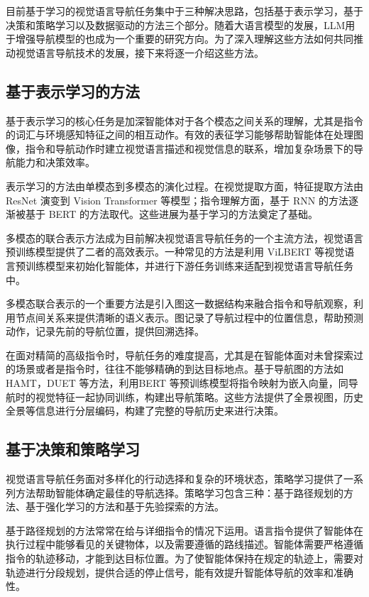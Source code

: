 \documentclass[bachelor]{thesis-uestc}
\begin{document}
目前基于学习的视觉语言导航任务集中于三种解决思路，包括基于表示学习，基于决策和策略学习以及数据驱动的方法三个部分。随着大语言模型的发展，LLM用于增强导航模型的也成为一个重要的研究方向。为了深入理解这些方法如何共同推动视觉语言导航技术的发展，接下来将逐一介绍这些方法。

\subsection{基于表示学习的方法}
   基于表示学习的核心任务是加深智能体对于各个模态之间关系的理解，尤其是指令的词汇与环境感知特征之间的相互动作。有效的表征学习能够帮助智能体在处理图像，指令和导航动作时建立视觉语言描述和视觉信息的联系，增加复杂场景下的导航能力和决策效率。

   表示学习的方法由单模态到多模态的演化过程。在视觉提取方面，特征提取方法由 ResNet\cite{he2015deep} 演变到 Vision Transformer\cite{dosovitskiyImageWorth16x162021} 等模型；指令理解方面，基于 RNN\cite{Sherstinsky_2020} 的方法逐渐被基于 BERT\cite{devlinBERTPretrainingDeep2019} 的方法取代。这些进展为基于学习的方法奠定了基础。

   多模态的联合表示方法成为目前解决视觉语言导航任务的一个主流方法，视觉语言预训练模型提供了二者的高效表示。一种常见的方法是利用 ViLBERT 等视觉语言预训练模型来初始化智能体，并进行下游任务训练来适配到视觉语言导航任务中。

   多模态联合表示的一个重要方法是引入图这一数据结构来融合指令和导航观察，利用节点间关系来提供清晰的语义表示。图记录了导航过程中的位置信息，帮助预测动作，记录先前的导航位置，提供回溯选择。

   在面对精简的高级指令时，导航任务的难度提高，尤其是在智能体面对未曾探索过的场景或者是指令时，往往不能够精确的到达目标地点。基于导航图的方法如HAMT\cite{chen2021history}，DUET\cite{chenThinkGlobalAct2022} 等方法，利用BERT\cite{devlinBERTPretrainingDeep2019} 等预训练模型将指令映射为嵌入向量，同导航时的视觉特征一起协同训练，构建出导航策略。这些方法提供了全景视图，历史全景等信息进行分层编码，构建了完整的导航历史来进行决策。

\subsection{基于决策和策略学习}
   视觉语言导航任务面对多样化的行动选择和复杂的环境状态，策略学习提供了一系列方法帮助智能体确定最佳的导航选择。策略学习包含三种：基于路径规划的方法、基于强化学习的方法和基于先验探索的方法。

   基于路径规划的方法常常在给与详细指令的情况下运用。语言指令提供了智能体在执行过程中能够看见的关键物体，以及需要遵循的路线描述。智能体需要严格遵循指令的轨迹移动，才能到达目标位置。为了使智能体保持在规定的轨迹上，需要对轨迹进行分段规划，提供合适的停止信号，能有效提升智能体导航的效率和准确性。
\end{document}
